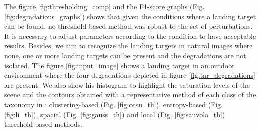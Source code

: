 The figure \ref{fig:thresholding_comp} and the F1-score graphs (Fig. \ref{fig:degradations_graphs}) shows that given the conditions where a landing target can be found, no threshold-based method was robust to the set of perturbations. It is necessary to adjust parameters according to the condition to have acceptable results. Besides, we aim to recognize the landing targets in natural images where none, one or more landing targets can be present and the degradations are not isolated. The figure \ref{fig:input_image} shows a landing target in an outdoor environment where the four degradations depicted in figure \ref{fig:tar_degradations} are present. We also show his histogram to highlight the saturation levels of the scene and the contours obtained with a representative method of each class of the taxonomy in \citep{Sezgin.Sankur:EI:2010}: clustering-based (Fig. \ref{fig:otsu_th}), entropy-based (Fig. \ref{fig:li_th}), spacial (Fig. \ref{fig:gauss_th}) and local (Fig. \ref{fig:sauvola_th}) threshold-based methods.


